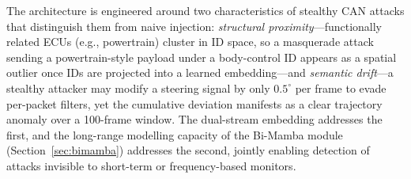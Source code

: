 \documentclass[lettersize,journal]{IEEEtran}
\begin{document}
The architecture is engineered around two characteristics of
stealthy CAN attacks that distinguish them from naive injection:
\textit{structural proximity}---functionally related ECUs
(e.g., powertrain) cluster in ID space, so a masquerade attack
sending a powertrain-style payload under a body-control ID
appears as a spatial outlier once IDs are projected into a learned
embedding---and \textit{semantic drift}---a stealthy attacker may
modify a steering signal by only $0.5^\circ$ per frame to evade
per-packet filters, yet the cumulative deviation manifests as a
clear trajectory anomaly over a 100-frame window. The dual-stream
embedding addresses the first, and the long-range modelling
capacity of the Bi-Mamba module (Section~\ref{sec:bimamba})
addresses the second, jointly enabling detection of attacks
invisible to short-term or frequency-based monitors.
\end{document}
